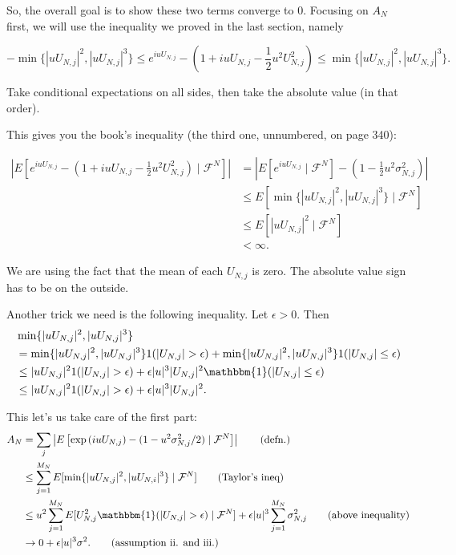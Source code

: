 \documentclass{article}
\begin{document}
So, the overall goal is to show these two terms converge to $0$. 
Focusing on $A_N$ first, we will use the inequality we proved in the last section, namely 

\[
-\min\{| u U_{N,j}|^2, | u U_{N,j}|^3 \} \le e^{i u U_{N,j}} - (1 +i u U_{N,j} - \frac{1}{2} u^2 U_{N,j}^2) \le \min\{| u U_{N,j}|^2, | u U_{N,j}|^3 \}.
\]

Take conditional expectations on all sides, then take the absolute value (in that order). 

This gives you the book's inequality (the third one, unnumbered, on page 340):

\begin{align*}
\left| E\left[e^{i u U_{N,j}} - (1 +i u U_{N,j} - \frac{1}{2} u^2 U_{N,j}^2) \mid \mathcal{F}^N \right]  \right| 
&= \left| E\left[e^{i u U_{N,j}}\mid \mathcal{F}^N \right] - (1  - \frac{1}{2} u^2 \sigma^2_{N,j})   \right|\\
&\le E\left[ \min\{| u U_{N,j}|^2, | u U_{N,j}|^3 \} \mid \mathcal{F}^N \right] \\
&\le E\left[ | u U_{N,j}|^2 \mid \mathcal{F}^N \right] \\
&<\infty \tag{assumption}.
\end{align*}

We are using the fact that the mean of each $U_{N,j}$ is zero. The absolute value sign has to be on the outside.

Another trick we need is the following inequality. Let $\epsilon > 0$. Then
\begin{align*}
&\min\{|uU_{N,j} |^2, |uU_{N,j}|^3 \} \\
&=\min\{|uU_{N,j} |^2, |uU_{N,j}|^3 \}  1(|U_{N,j}| > \epsilon) + \min\{|uU_{N,j} |^2, |uU_{N,j}|^3 \}  1(|U_{N,j}| \le \epsilon) \\
&\le |uU_{N,j} |^2 1(|U_{N,j}| > \epsilon) + \epsilon|u|^3 |U_{N,j}|^2  \mathbbm{1}(|U_{N,j}| \le \epsilon) \\
&\le |uU_{N,j} |^2 1(|U_{N,j}| > \epsilon) + \epsilon|u|^3 |U_{N,j}|^2. 
\end{align*}


This let's us take care of the first part:
\begin{align*}
A_N &= \sum_j \left| E\left[   \exp\left( i u U_{N,j} \right)  - (1 - u^2 \sigma^2_{N,j}/2) \mid \mathcal{F}^N \right] \right| \tag{defn.} \\
&\le \sum_{j=1}^{M_N} E[ \min\{|uU_{N,j} |^2, |uU_{N,i}|^3 \} \mid \mathcal{F}^N ] \tag{Taylor's ineq} \\
&\le u^2 \sum_{j=1}^{M_N} E[ U_{N,j}^2 \mathbbm{1}(|U_{N,j}| > \epsilon) \mid \mathcal{F}^N ] + \epsilon |u|^3 \sum_{j=1}^{M_N} \sigma^2_{N,j} \tag{above inequality} \\
&\to 0 + \epsilon |u|^3 \sigma^2. \tag{assumption ii. and iii.}
\end{align*}
\end{document}
